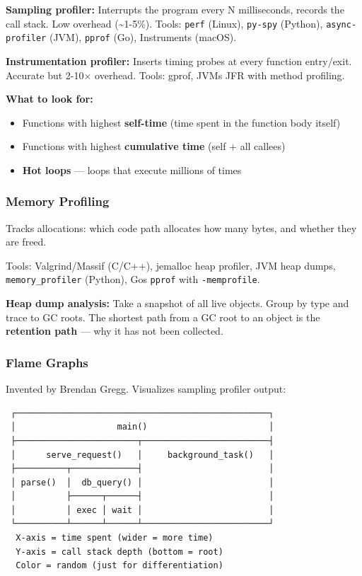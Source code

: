 \documentclass[11pt]{article}
\providecommand{\tightlist}{\setlength{\itemsep}{1pt}\setlength{\parskip}{0pt}}
\begin{document}
\textbf{Sampling profiler:} Interrupts the program every N milliseconds, records the call stack. Low overhead (\textasciitilde1-5\%). Tools: \texttt{perf} (Linux), \texttt{py-spy} (Python), \texttt{async-profiler} (JVM), \texttt{pprof} (Go), Instruments (macOS).

\textbf{Instrumentation profiler:} Inserts timing probes at every function entry/exit. Accurate but 2-10\(\times\) overhead. Tools: gprof, JVM\textquotesingle s JFR with method profiling.

\textbf{What to look for:}

\begin{itemize}
\tightlist
\item
  Functions with highest \textbf{self-time} (time spent in the function body itself)
\item
  Functions with highest \textbf{cumulative time} (self + all callees)
\item
  \textbf{Hot loops} --- loops that execute millions of times
\end{itemize}

\subsubsection{Memory Profiling}\label{memory-profiling}

Tracks allocations: which code path allocates how many bytes, and whether they are freed.

Tools: Valgrind/Massif (C/C++), jemalloc heap profiler, JVM heap dumps, \texttt{memory\_profiler} (Python), Go\textquotesingle s \texttt{pprof} with \texttt{-memprofile}.

\textbf{Heap dump analysis:} Take a snapshot of all live objects. Group by type and trace to GC roots. The shortest path from a GC root to an object is the \textbf{retention path} --- why it has not been collected.

\subsubsection{Flame Graphs}\label{flame-graphs}

Invented by Brendan Gregg. Visualizes sampling profiler output:

\setcodelang{}

\begin{verbatim}
 ┌──────────────────────────────────────────────────┐
 │                    main()                        │
 ├────────────────────────┬─────────────────────────┤
 │      serve_request()   │     background_task()   │
 ├──────────┬─────────────┤                         │
 │ parse()  │  db_query() │                         │
 │          ├──────┬──────┤                         │
 │          │ exec │ wait │                         │
 └──────────┴──────┴──────┴─────────────────────────┘
  X-axis = time spent (wider = more time)
  Y-axis = call stack depth (bottom = root)
  Color = random (just for differentiation)
\end{verbatim}
\end{document}

